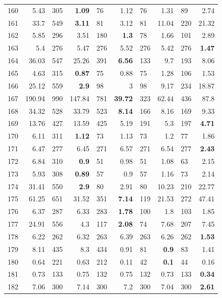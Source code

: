\begin{longtable}{lr@{\hskip 4pt}l@{\hskip 12pt}r@{\hskip 4pt}l@{\hskip 12pt}r@{\hskip 4pt}l@{\hskip 12pt}r@{\hskip 4pt}l@{\hskip 12pt}r}
160 & 5.43 & 305 & \textbf{1.09} & 76 & 1.12 & 76 & 1.31 & 89 & 2.74 \\
161 & 33.7 & 549 & \textbf{3.11} & 81 & 3.12 & 81 & 11.04 & 220 & 21.32 \\
162 & 5.85 & 296 & 3.51 & 180 & \textbf{1.3} & 78 & 1.66 & 101 & 2.89 \\
163 & 5.4 & 276 & 5.47 & 276 & 5.52 & 276 & 5.42 & 276 & \textbf{1.47} \\
164 & 36.03 & 547 & 25.26 & 391 & \textbf{6.56} & 133 & 9.7 & 193 & 8.06 \\
165 & 4.63 & 315 & \textbf{0.87} & 75 & 0.88 & 75 & 1.28 & 106 & 1.53 \\
166 & 25.12 & 559 & \textbf{2.9} & 98 & 3 & 98 & 9.17 & 234 & 18.87 \\
167 & 190.94 & 990 & 147.84 & 781 & \textbf{39.72} & 323 & 62.44 & 436 & 87.8 \\
168 & 34.32 & 528 & 33.79 & 523 & \textbf{8.14} & 166 & 8.16 & 169 & 9.33 \\
169 & 13.76 & 427 & 13.59 & 425 & 5.19 & 191 & 5.3 & 197 & \textbf{4.71} \\
170 & 6.11 & 311 & \textbf{1.12} & 73 & 1.13 & 73 & 1.2 & 77 & 1.86 \\
171 & 6.47 & 277 & 6.45 & 271 & 6.57 & 271 & 6.54 & 277 & \textbf{2.43} \\
172 & 6.84 & 310 & \textbf{0.9} & 51 & 0.98 & 51 & 1.08 & 63 & 2.15 \\
173 & 5.93 & 308 & \textbf{0.89} & 57 & 0.9 & 57 & 1.16 & 73 & 2.14 \\
174 & 31.41 & 550 & \textbf{2.9} & 80 & 2.91 & 80 & 10.23 & 210 & 22.77 \\
175 & 61.25 & 651 & 31.52 & 351 & \textbf{7.14} & 119 & 21.53 & 272 & 47.41 \\
176 & 6.37 & 287 & 6.33 & 283 & \textbf{1.78} & 100 & 1.8 & 103 & 1.85 \\
177 & 24.91 & 556 & 4.3 & 117 & \textbf{2.08} & 74 & 7.68 & 207 & 7.45 \\
178 & 6.22 & 262 & 6.32 & 263 & 6.39 & 263 & 6.26 & 262 & \textbf{1.53} \\
179 & 8.11 & 435 & 8.3 & 434 & 0.91 & 81 & \textbf{0.9} & 83 & 1.41 \\
180 & 0.64 & 221 & 0.63 & 212 & 0.11 & 42 & \textbf{0.1} & 44 & 0.16 \\
181 & 0.73 & 133 & 0.75 & 132 & 0.75 & 132 & 0.73 & 133 & \textbf{0.34} \\
182 & 7.06 & 300 & 7.14 & 300 & 7.2 & 300 & 7.04 & 300 & \textbf{2.61} \\

\end{longtable}
